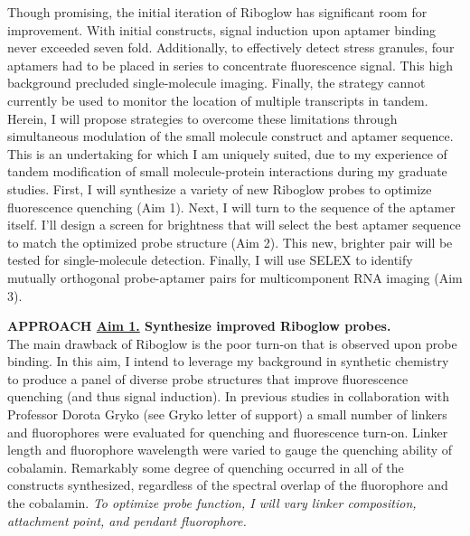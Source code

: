 Though promising, the initial iteration of Riboglow has significant room for improvement. With initial constructs, signal induction upon aptamer binding never exceeded seven fold.
 Additionally, to effectively detect stress granules, four aptamers had to be placed in series to concentrate fluorescence signal. This high background precluded single-molecule imaging.
 Finally, the strategy cannot currently be used to monitor the location of multiple transcripts in tandem. Herein, I will propose strategies to overcome these limitations through simultaneous modulation of the small molecule construct and aptamer sequence. This is an undertaking for which I am uniquely suited, due to my experience of tandem modification of small molecule-protein interactions during my graduate studies. First, I will synthesize a variety of new Riboglow probes to optimize fluorescence quenching (Aim 1). Next, I will turn to the sequence of the aptamer itself. I'll design a screen for brightness that will select the best aptamer sequence to match the optimized probe structure (Aim 2). This new, brighter pair will be tested for single-molecule detection. Finally, I will use SELEX to identify mutually orthogonal probe-aptamer pairs for multicomponent RNA imaging (Aim 3).

\textbf{APPROACH \underline{Aim 1.} Synthesize improved Riboglow probes.}\\
The main drawback of Riboglow is the poor turn-on that is observed upon probe binding. In this aim, I intend to leverage my background in synthetic chemistry to produce a panel of diverse probe structures that improve fluorescence quenching (and thus signal induction). In previous studies in collaboration with Professor Dorota Gryko (see Gryko letter of support) a small number of linkers and fluorophores were evaluated for quenching and fluorescence turn-on. Linker length and fluorophore wavelength were varied to gauge the quenching ability of cobalamin. Remarkably some degree of quenching occurred in all of the constructs synthesized, regardless of the spectral overlap of the fluorophore and the cobalamin. \textit{To optimize probe function, I will vary linker composition, attachment point, and pendant fluorophore.}

